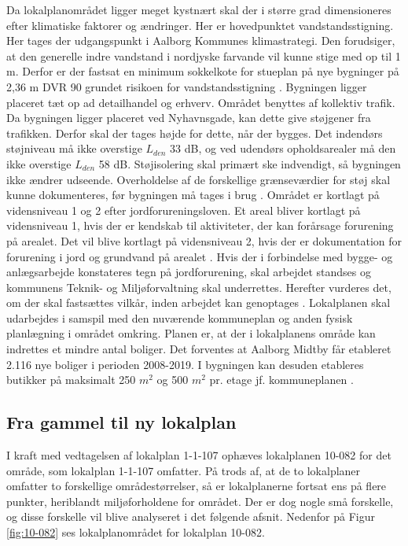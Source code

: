 Da lokalplanområdet ligger meget kystnært skal der i større grad dimensioneres efter klimatiske faktorer og ændringer. Her er hovedpunktet vandstandsstigning. Her tages der udgangspunkt i Aalborg Kommunes klimastrategi. Den forudsiger, at den generelle indre vandstand i nordjyske farvande vil kunne stige med op til 1 m. Derfor er der fastsat en minimum sokkelkote for stueplan på nye bygninger på 2,36 m DVR 90 grundet risikoen for vandstandsstigning \citep[ s. 9]{lokalplan}.
\newline \indent{     }  Bygningen ligger placeret tæt op ad detailhandel og erhverv. Området benyttes af kollektiv trafik. Da bygningen ligger placeret ved Nyhavnsgade, kan dette give støjgener fra trafikken. Derfor skal der tages højde for dette, når der bygges. Det indendørs støjniveau må ikke overstige $L_{den}$ 33 dB, og ved udendørs opholdsarealer må den ikke overstige $L_{den}$ 58 dB. Støjisolering skal primært ske indvendigt, så bygningen ikke ændrer udseende. Overholdelse af de forskellige grænseværdier for støj skal kunne dokumenteres, før bygningen må tages i brug \citep[ s. 8]{lokalplan}. Området er kortlagt på vidensniveau 1 og 2 efter jordforureningsloven. Et areal bliver kortlagt på vidensniveau 1, hvis der er kendskab til aktiviteter, der kan forårsage forurening på arealet. Det vil blive kortlagt på vidensniveau 2, hvis der er dokumentation for forurening i jord og grundvand på arealet \citep{vidensniveau}. Hvis der i forbindelse med bygge- og anlægsarbejde konstateres tegn på jordforurening, skal arbejdet standses og kommunens Teknik- og Miljøforvaltning skal underrettes. Herefter vurderes det, om der skal fastsættes vilkår, inden arbejdet kan genoptages \citep[ s. 10]{lokalplan}.
\newline
\newline
Lokalplanen skal udarbejdes i samspil med den nuværende kommuneplan og anden fysisk planlægning i området omkring. Planen er, at der i lokalplanens område kan indrettes et mindre antal boliger. Det forventes at Aalborg Midtby får etableret 2.116 nye boliger i perioden 2008-2019. I bygningen kan desuden etableres butikker på maksimalt 250 $m^2$  og 500 $m^2$ pr. etage jf. kommuneplanen \citep[ s. 8]{lokalplan}.

\subsection{Fra gammel til ny lokalplan}
I kraft med vedtagelsen af lokalplan 1-1-107 ophæves lokalplanen 10-082 for det område, som lokalplan 1-1-107 omfatter. På trods af, at de to lokalplaner omfatter to forskellige områdestørrelser, så er lokalplanerne fortsat ens på flere punkter, heriblandt miljøforholdene for området. Der er dog nogle små forskelle, og disse forskelle vil blive analyseret i det følgende afsnit. Nedenfor på Figur \ref{fig:10-082} ses lokalplanområdet for lokalplan 10-082.

